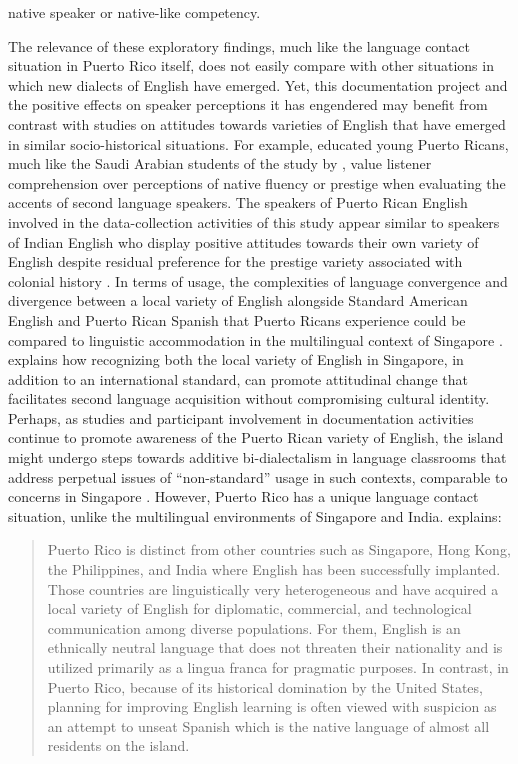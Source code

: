 \documentclass[output=paper,colorlinks,citecolor=brown]{langscibook}
\begin{document}
native speaker or native-like competency.

The relevance of these exploratory findings, much like the language contact situation in Puerto Rico itself, does not easily compare with other situations in which new dialects of English have emerged. Yet, this documentation project and the positive effects on speaker perceptions it has engendered may benefit from contrast with studies on attitudes towards varieties of English that have emerged in similar socio-historical situations. For example, educated young Puerto Ricans, much like the Saudi Arabian students of the study by \citet[1047]{AlDosari2011}, value listener comprehension over perceptions of native fluency or prestige when evaluating the accents of second language speakers. The speakers of Puerto Rican English involved in the data-collection activities of this study appear similar to speakers of Indian English who display positive attitudes towards their own variety of English despite residual preference for the prestige variety associated with colonial history \citep{Bernaisch_Koch_2015}. In terms of usage, the complexities of language convergence and divergence between a local variety of English alongside Standard American English and Puerto Rican Spanish that Puerto Ricans experience could be compared to linguistic accommodation in the multilingual context of Singapore \citep{Ng_Cavallaro_Koh_2014}. \citet{Ruanni_Tupas_2016} explains how recognizing both the local variety of English in Singapore, in addition to an international standard, can promote attitudinal change that facilitates second language acquisition without compromising cultural identity. Perhaps, as studies and participant involvement in documentation activities continue to promote awareness of the Puerto Rican variety of English, the island might undergo steps towards additive bi-dialectalism in language classrooms that address perpetual issues of “non-standard” usage in such contexts, comparable to concerns in Singapore \citep{Tan_2008}. However, Puerto Rico has a unique language contact situation, unlike the multilingual environments of Singapore and India. \citet[17]{Pousada_2006} explains:

\begin{quote}
    Puerto Rico is distinct from other countries such as Singapore, Hong Kong, the Philippines, and India where English has been successfully implanted. Those countries are linguistically very heterogeneous and have acquired a local variety of English for diplomatic, commercial, and technological communication among diverse populations. For them, English is an ethnically neutral language that does not threaten their nationality and is utilized primarily as a lingua franca for pragmatic purposes. In contrast, in Puerto Rico, because of its historical domination by the United States, planning for improving English learning is often viewed with suspicion as an attempt to unseat Spanish which is the native language of almost all residents on the island.
\end{quote}
\end{document}
